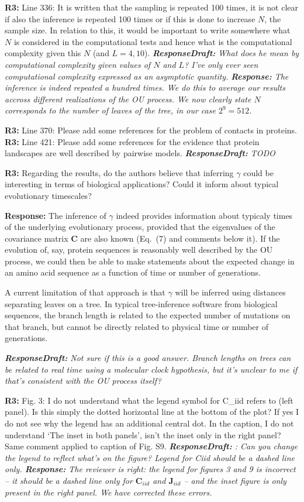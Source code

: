 \documentclass[aps,rmp,onecolumn]{revtex4-1}
\newcommand{\refc}[1]{\textbf{R3:} #1\vskip 5mm}
\newcommand{\response}[1]{{\it {\color{response}\textbf{Response:} #1}}\vskip 5mm}
\newcommand{\responsedraft}[1]{{\it {\color{purple}\textbf{ResponseDraft:} #1}}\vskip 5mm}
\begin{document}
\refc{Line 336: It is written that the sampling is repeated 100 times, it is not clear if also the inference is repeated 100 times or if this is done to increase $N$, the sample size. In relation to this, it would be important to write somewhere what $N$ is considered in the computational tests and hence what is the computational complexity given this $N$ (and $L=4,10$).}
\responsedraft{What does he mean by computational complexity given values of $N$ and $L$? 
I've only ever seen computational complexity expressed as an asymptotic quantity.}
\response{The inference is indeed repeated a hundred times. 
We do this to average our results accross different realizations of the OU process. 
We now clearly state $N$ corresponds to the number of leaves of the tree, in our case $2^9=512$.}

\refc{Line 370: Please add some references for the problem of contacts in proteins.}
\refc{Line 421: Please add some references for the evidence that protein landscapes are well described by pairwise models.}
\responsedraft{TODO}

\refc{Regarding the results, do the authors believe that inferring $\gamma$ could be interesting in terms of biological applications? Could it inform about typical evolutionary timescales?}
\response{The inference of $\gamma$ indeed provides information about typicaly times of the underlying evolutionary process, provided that the eigenvalues of the covariance matrix $\bm{C}$ are also known (Eq.~(7) and comments below it). 
If the evolution of, say, protein sequences is reasonably well described by the OU process, we could then be able to make statements about the expected change in an amino acid sequence as a function of time or number of generations. 

A current limitation of that approach is that $\gamma$ will be inferred using distances separating leaves on a tree. 
In typical tree-inference software from biological sequences, the branch length is related to the expected number of mutations on that branch, but cannot be directly related to physical time or number of generations. 
}
\responsedraft{Not sure if this is a good answer. Branch lengths on trees can be related to real time using a molecular clock hypothesis, but it's unclear to me if that's consistent with the OU process itself?}

\refc{Fig. 3: I do not understand what the legend symbol for C_iid refers to (left panel). Is this simply the dotted horizontal line at the bottom of the plot? If yes I do not see why the legend has an additional central dot. In the caption, I do not understand ‘The inset in both panels’, isn’t the inset only in the right panel? Same comment applied to caption of Fig. S9.}
\responsedraft{: Can you change the legend to reflect what's on the figure? Legend for Ciid should be a dashed line only. }
\response{The reviewer is right: the legend for figures 3 and 9 is incorrect -- it should be a dashed line only for $\bm{C}_{iid}$ and $\bm{J}_{iid}$ -- and the inset figure is only present in the right panel. 
We have corrected these errors. }
\end{document}

